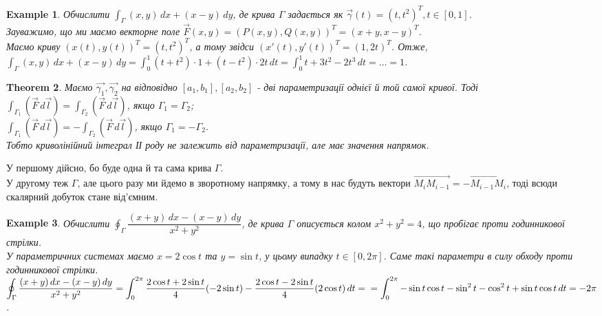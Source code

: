 \documentclass[a4paper, 10pt]{article}
\theoremstyle{theoremdd}
\newtheorem{theorem}{Theorem}[subsection]
\theoremstyle{theoremdd}
\theoremstyle{theoremdd}
\theoremstyle{theoremdd}
\newtheorem{example}[theorem]{Example}
\theoremstyle{theoremdd}
\theoremstyle{theoremdd}
\theoremstyle{theoremdd}
\theoremstyle{theoremdd}
\begin{document}
\begin{example}
Обчислити $\displaystyle\int_\Gamma (x,y)\,dx + (x-y)\,dy$, де крива $\Gamma$ задається як $\vec{\gamma}(t) = (t,t^2)^T, t \in [0,1]$.\\
Зауважимо, що ми маємо векторне поле $\vec{F}(x,y) = (P(x,y),Q(x,y))^T = (x+y,x-y)^T$.\\
Маємо криву $(x(t),y(t))^T = (t,t^2)^T$, а тому звідси $(x'(t),y'(t))^T = (1,2t)^T$. Отже,\\
$\displaystyle\int_\Gamma (x,y)\,dx + (x-y)\,dy = \int_0^1 (t+t^2) \cdot 1 + (t-t^2) \cdot 2t\,dt = \int_0^1 t+3t^2-2t^3\,dt = \dots = 1$.
\end{example}

\begin{theorem}
Маємо $\vec{\gamma_1},\vec{\gamma_2}$ на відповідно $[a_1,b_1], [a_2,b_2]$ - дві параметризації однієї й той самої кривої. Тоді\\
$\displaystyle\int_{\Gamma_1} (\vec{F}\,d\vec{l}) = \int_{\Gamma_2} (\vec{F}\,d\vec{l})$, якщо $\Gamma_1 = \Gamma_2$;\\
$\displaystyle\int_{\Gamma_1 } (\vec{F}\,d\vec{l}) = -\int_{\Gamma_2} (\vec{F}\,d\vec{l})$, якщо $\Gamma_1 = -\Gamma_2$.\\
Тобто криволінійний інтеграл ІІ роду не залежить від параметризації, але має значення напрямок.
\end{theorem}

У першому дійсно, бо буде одна й та сама крива $\Gamma$.\\
У другому теж $\Gamma$, але цього разу ми йдемо в зворотному напрямку, а тому в нас будуть вектори $\overrightarrow{M_{i}M_{i-1}} = -\overrightarrow{M_{i-1}M_i}$, тоді всюди скалярний добуток стане від'ємним.

\begin{example}
Обчислити $\displaystyle\oint_\Gamma \dfrac{(x+y)\,dx - (x-y)\,dy}{x^2+y^2}$, де крива $\Gamma$ описується колом $x^2+y^2 = 4$, що пробігає проти годинникової стрілки.\\
У параметричних системах маємо $x = 2 \cos t$ та $y = \sin t$, у цьому випадку $t \in [0,2\pi]$. Саме такі параметри в силу обходу проти годинникової стрілки.\\
$\displaystyle\oint_\Gamma \dfrac{(x+y)\,dx - (x-y)\,dy}{x^2+y^2} = \int_0^{2\pi} \dfrac{2 \cos t + 2 \sin t}{4} (-2\sin t) - \dfrac{2 \cos t - 2 \sin t}{4} (2 \cos t)\,dt = \\
= \int_{0}^{2\pi} -\sin t \cos t - \sin^2 t - \cos^2 t + \sin t \cos t\,dt = -2\pi$.
\end{example}
\end{document}
